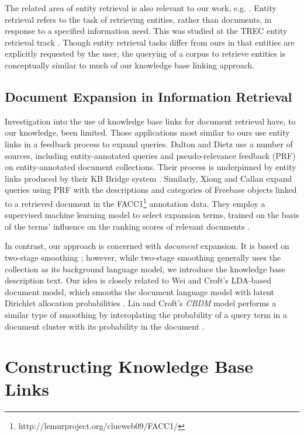 \documentclass{sig-alternate}
\begin{document}
The related area of entity retrieval is also relevant to our work, e.g. \cite{Adafre2007, Bron2010}. Entity retrieval refers to the task of retrieving entities, rather than documents, in response to a specified information need. This was studied at the TREC entity retrieval track \cite{Balog2011}. Though entity retrieval tasks differ from ours in that entities are explicitly requested by the user, the querying of a corpus to retrieve entities is conceptually similar to much of our knowledge base linking approach.

\subsection{Document Expansion in Information Retrieval}\label{section.related.ir}

Investigation into the use of knowledge base links for document retrieval have, to our knowledge, been limited. Those applications most similar to ours use entity links in a feedback process to expand queries. Dalton and Dietz \cite{Dalton2014} use a number of sources, including entity-annotated queries and pseudo-relevance feedback (PRF) on entity-annotated document collections. Their process is underpinned by entity links produced by their KB Bridge system \cite{Dalton2013}. Similarly, Xiong and Callan expand queries using PRF with the descriptions and categories of Freebase objects linked to a retrieved document in the FACC1\footnote{http://lemurproject.org/clueweb09/FACC1/} annotation data. They employ a supervised machine learning model to select expansion terms, trained on the basis of the terms' influence on the ranking scores of relevant documents \cite{Xiong2015}.

In contrast, our approach is concerned with \textit{document} expansion. It is based on two-stage smoothing \cite{Zhai2004}; however, while two-stage smoothing generally uses the collection as its background language model, we introduce the knowledge base description text. Our idea is closely related to Wei and Croft's LDA-based document model, which smooths the document language model with latent Dirichlet allocation probabilities \cite{Wei2006}. Liu and Croft's \textit{CBDM} model performs a similar type of smoothing by interoplating the probability of a query term in a document cluster with its probability in the document \cite{Liu2004}.

\section{Constructing Knowledge Base Links}\label{section.linking}
\end{document}
